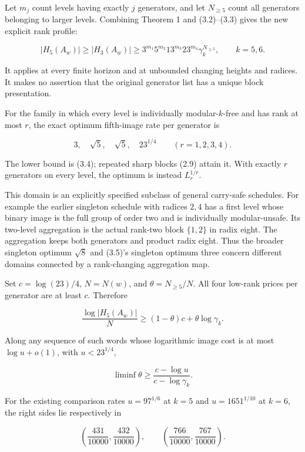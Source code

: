 \documentclass[11pt,a4paper]{article}
\begin{document}
Let \(m_j\) count levels having exactly \(j\) generators, and let \(N_{\ge5}\) count all generators belonging to larger levels. Combining Theorem 1 and (3.2)--(3.3) gives the new explicit rank profile:

\[
\boxed{
|H_5(A_w)|\ge|H_3(A_w)|
\ge3^{m_1}5^{m_2}13^{m_3}23^{m_4}
\gamma_k^{N_{\ge5}},\qquad k=5,6.
}
\tag{3.4}
\]

It applies at every finite horizon and at unbounded changing heights and radices. It makes no assertion that the original generator list has a unique block presentation.

For the family in which every level is individually modular-\(k\)-free and has rank at most \(r\), the exact optimum fifth-image rate per generator is

\[
\boxed{3,\quad\sqrt5,\quad\sqrt5,\quad23^{1/4}
\qquad(r=1,2,3,4).}
\tag{3.5}
\]

The lower bound is (3.4); repeated sharp blocks (2.9) attain it. With exactly \(r\) generators on every level, the optimum is instead \(L_r^{1/r}\).

This domain is an explicitly specified subclass of general carry-safe schedules. For example the earlier singleton schedule with radices \(2,4\) has a first level whose binary image is the full group of order two and is individually modular-unsafe. Its two-level aggregation is the actual rank-two block \(\{1,2\}\) in radix eight. The aggregation keeps both generators and product radix eight. Thus the broader singleton optimum \(\sqrt8\) and (3.5)'s singleton optimum three concern different domains connected by a rank-changing aggregation map.

Set \(c=\log(23)/4\), \(N=N(w)\), and \(\theta=N_{\ge5}/N\). All four low-rank prices per generator are at least \(c\). Therefore

\[
\boxed{
\frac{\log |H_5(A_w)|}{N}
\ge(1-\theta)c+\theta\log\gamma_k.
}
\tag{3.6}
\]

Along any sequence of such words whose logarithmic image cost is at most \(\log u+o(1)\), with \(u<23^{1/4}\),

\[
\liminf\theta\ge
\frac{c-\log u}{c-\log\gamma_k}.
\tag{3.7}
\]

For the existing comparison rates \(u=97^{1/6}\) at \(k=5\) and \(u=1651^{1/10}\) at \(k=6\), the right sides lie respectively in

\[
\left(\frac{431}{10000},\frac{432}{10000}\right),
\qquad
\left(\frac{766}{10000},\frac{767}{10000}\right).
\tag{3.8}
\]
\end{document}
